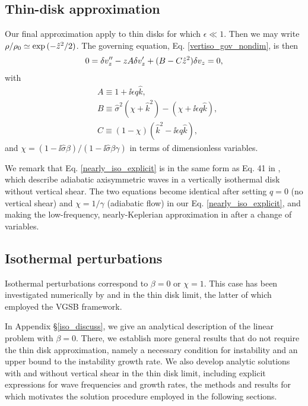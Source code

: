 \subsection{Thin-disk approximation}\label{analytic_relax}
Our final approximation apply to thin disks for 
which $\epsilon\ll 1$. Then we may write $\rho/\rho_0\simeq
\exp{(-\hat{z}^2/2)}$. The governing equation,
Eq. \ref{vertiso_gov_nondim}, is then   
\begin{align}
  0 = \delta v_z^{\prime\prime} - z A\delta v_z^\prime +
  (B - C\hat{z}^2)\delta v_z = 0,\label{nearly_iso_explicit}
\end{align}
with
\begin{align}
  &A \equiv 1 + \ii \epsilon q \hat{k},\\
  &B \equiv \hat{\sigma}^2\left(\chi + \hat{k}^2\right) -
  \left(\chi + \ii \epsilon q \hat{k}\right),\\
  &C \equiv \left(1-\chi\right)\left(\hat{k}^2 - \ii
    \epsilon q\hat{k}\right), 
\end{align}
and $\chi =
\left(1-\ii\hat{\sigma}\beta\right)/\left(1-\ii\hat{\sigma}\beta\gamma\right)
$ in terms of dimensionless variables. 

We remark that Eq. \ref{nearly_iso_explicit} is in the same 
form as Eq. 41 in \cite{lubow93}, which describe adiabatic axisymmetric waves in
a vertically isothermal disk without vertical shear. The two equations
become identical after  setting $q=0$ (no vertical shear) and
$\chi=1/\gamma$ (adiabatic flow) in our Eq. \ref{nearly_iso_explicit},
and making the low-frequency, nearly-Keplerian approximation in
\citeauthor{lubow93} after a change of variables.    


\subsection{Isothermal perturbations}\label{iso_pert}
Isothermal perturbations correspond to $\beta = 0$ or $\chi = 1$. This
case has been investigated numerically by \cite{nelson13} and 
\cite{mcnally14} in the thin disk limit, the latter of which employed
the VGSB framework. 

In Appendix \S\ref{iso_discuss}, we give an analytical description of the
linear problem with $\beta=0$. There, we establish more general
results that do not require the thin disk approximation, namely 
a necessary condition for instability and an upper bound to the
instability growth rate. We also develop analytic solutions
with and without vertical shear in the thin disk limit, including
explicit expressions for wave frequencies and growth rates, the
methods and results for which motivates the solution procedure
employed in the following sections.    

